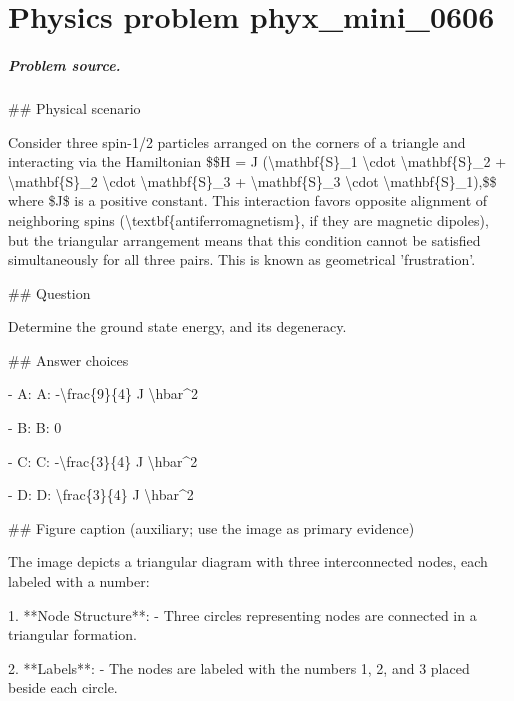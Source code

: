 
\chapter{Physics problem phyx\_mini\_0606}
\label{ch:PhyXMiniProblems_problem_phyx_mini_0606}

\paragraph{Problem source.}
\#\# Physical scenario

Consider three spin-1/2 particles arranged on the corners of a triangle and interacting via the Hamiltonian \$\$H = J (\textbackslash{}mathbf\{S\}\_1 \textbackslash{}cdot \textbackslash{}mathbf\{S\}\_2 + \textbackslash{}mathbf\{S\}\_2 \textbackslash{}cdot \textbackslash{}mathbf\{S\}\_3 + \textbackslash{}mathbf\{S\}\_3 \textbackslash{}cdot \textbackslash{}mathbf\{S\}\_1),\$\$ where \$J\$ is a positive constant. This interaction favors opposite alignment of neighboring spins (\textbackslash{}textbf\{antiferromagnetism\}, if they are magnetic dipoles), but the triangular arrangement means that this condition cannot be satisfied simultaneously for all three pairs. This is known as geometrical 'frustration'.

\#\# Question

Determine the ground state energy, and its degeneracy.

\#\# Answer choices

- A: A: -\textbackslash{}frac\{9\}\{4\} J \textbackslash{}hbar\textasciicircum{}2

- B: B: 0

- C: C: -\textbackslash{}frac\{3\}\{4\} J \textbackslash{}hbar\textasciicircum{}2

- D: D: \textbackslash{}frac\{3\}\{4\} J \textbackslash{}hbar\textasciicircum{}2

\#\# Figure caption (auxiliary; use the image as primary evidence)

The image depicts a triangular diagram with three interconnected nodes, each labeled with a number:

1. **Node Structure**:
   - Three circles representing nodes are connected in a triangular formation.

2. **Labels**:
   - The nodes are labeled with the numbers 1, 2, and 3 placed beside each circle.

